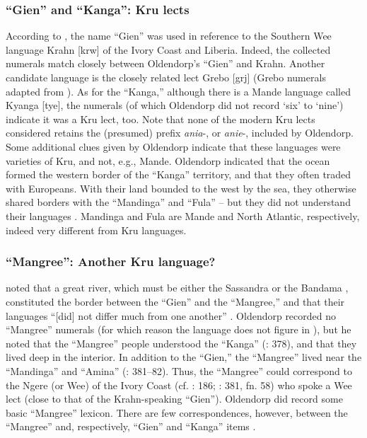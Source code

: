 \documentclass[output=paper,colorlinks,citecolor=brown]{langscibook}
\begin{document}
\subsubsection{``Gien'' and ``Kanga'': Kru lects}

\begin{sloppypar}
According to \citet[50--51]{Westermann_Bryan_1952}, the name “Gien” was used in reference to the Southern Wee language Krahn [krw] of the Ivory Coast and Liberia. Indeed, the collected numerals match closely between Oldendorp's ``Gien'' and Krahn. Another candidate language is the closely related lect Grebo [grj] (Grebo numerals adapted from \cite{Innes_1967}). As for the “Kanga,” although there is a Mande language called Kyanga [tye], the numerals (of which Oldendorp did not record `six' to `nine') indicate it was a Kru lect, too. Note that none of the modern Kru lects considered retains the (presumed) prefix \emph{ania}-, or \emph{anie}-, included by Oldendorp. Some additional clues given by Oldendorp indicate that these languages were varieties of Kru, and not, e.g., Mande. Oldendorp indicated that the ocean formed the western border of the ``Kanga'' territory, and that they often traded with Europeans. With their land bounded to the west by the sea, they otherwise shared borders with the ``Mandinga'' and ``Fula'' – but they did not understand their languages \citep[378]{Oldendorp_2000}. Mandinga and Fula are Mande and North Atlantic, respectively, indeed very different from Kru languages.
\end{sloppypar}

\subsubsection{``Mangree'': Another Kru language?}

\citet[382]{Oldendorp_2000} noted that a great river, which must be either the Sassandra or the Bandama \citep[cf.][162]{Fodor_1975}, constituted the border between the ``Gien'' and the ``Mangree,'' and that their languages ``[did] not differ much from one another'' \citep[162]{Highfield_1987}. Oldendorp recorded no ``Mangree'' numerals (for which reason the language does not figure in ), but he noted that the ``Mangree'' people understood the ``Kanga'' (\citeyear{Oldendorp_2000}: 378), and that they lived deep in the interior. In addition to the ``Gien,'' the ``Mangree'' lived near the ``Mandinga'' and ``Amina'' (\citeyear{Oldendorp_2000}: 381–82). Thus, the ``Mangree'' could correspond to the Ngere (or Wee) of the Ivory Coast (cf. \cite{Jones_2010}: 186; \cite{Oldendorp_2000}: 381, fn. 58) who spoke a Wee lect (close to that of the Krahn-speaking ``Gien''). Oldendorp did record some basic ``Mangree'' lexicon. There are few correspondences, however, between the ``Mangree'' and, respectively, ``Gien'' and ``Kanga'' items \citep[cf.][460--461]{Oldendorp_2000}.
\end{document}
